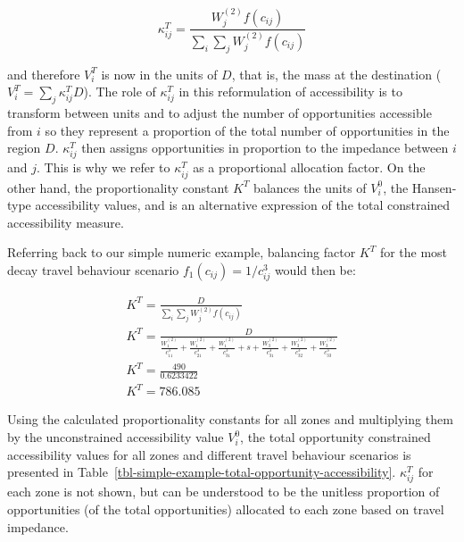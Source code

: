 \documentclass[
]{article}
\begin{document}
\[
\kappa_{ij}^T = \frac{W^{(2)}_j f(c_{ij})}{\sum_i\sum_j W^{(2)}_jf(c_{ij})}
\]

\noindent and therefore \(V^T_i\) is now in the units of \(D\), that is,
the mass at the destination (\(V^T_i = \sum_j \kappa_{ij}^T D\)). The
role of \(\kappa_{ij}^T\) in this reformulation of accessibility is to
transform between units and to adjust the number of opportunities
accessible from \(i\) so they represent a proportion of the total number
of opportunities in the region \(D\). \(\kappa_{ij}^T\) then assigns
opportunities in proportion to the impedance between \(i\) and \(j\).
This is why we refer to \(\kappa_{ij}^T\) as a proportional allocation
factor. On the other hand, the proportionality constant \(K^T\) balances
the units of \(V^0_i\), the Hansen-type accessibility values, and is an
alternative expression of the total constrained accessibility measure.

Referring back to our simple numeric example, balancing factor \(K^T\)
for the most decay travel behaviour scenario
\(f_1(c_{ij}) = 1/c_{ij}^3\) would then be:

\[
\begin{array}{l}
K^T = \frac{D}{\sum_{i}\sum_{j} W_j^{(2)} f(c_{ij})}\\
K^T = \frac{D}{\frac{W_1^{(2)}}{c_{11}^3}+\frac{W_1^{(2)}}{c_{21}^3} + \frac{W_1^{(2)}}{c_{31}^3} + s + \frac{W_3^{(2)}}{c_{31}^3} + \frac{W_3^{(2)}}{c_{32}^3} + \frac{W_3^{(2)}}{c_{33}^3}
}\\
K^T = \frac{490}{0.6233422} \\
K^T = 786.085
\end{array}
\]

Using the calculated proportionality constants for all zones and
multiplying them by the unconstrained accessibility value \(V^0_i\), the
total opportunity constrained accessibility values for all zones and
different travel behaviour scenarios is presented in
Table~\ref{tbl-simple-example-total-opportunity-accessibility}.
\(\kappa_{ij}^T\) for each zone is not shown, but can be understood to
be the unitless proportion of opportunities (of the total opportunities)
allocated to each zone based on travel impedance.
\end{document}
